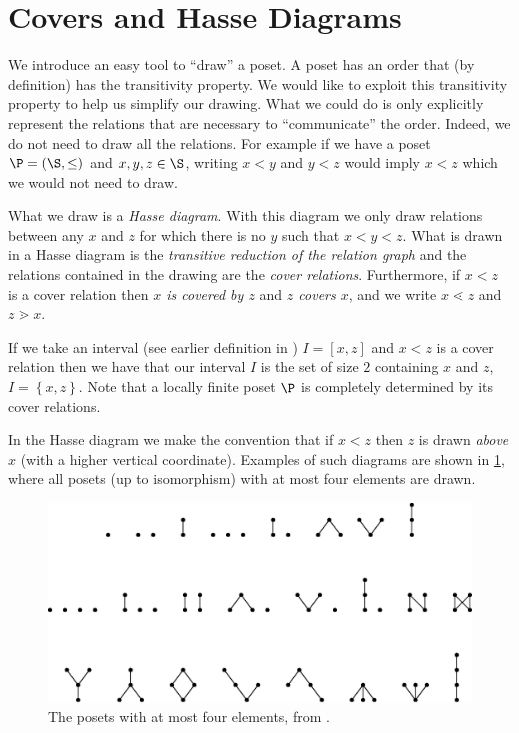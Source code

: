 \section{Covers and Hasse Diagrams}
\label{tree:poset:hasse}

We introduce an easy tool to ``draw'' a poset. A poset has an order that (by definition) has the transitivity property.
We would like to exploit this transitivity property to help us simplify our
drawing. What we could do is only explicitly represent the relations that are
necessary to ``communicate'' the order. Indeed, we do not need to draw
all the relations. For example if we have a poset $\P = (\S, \le)$ and $x, y, z
\in \S$, writing $x < y$ and $y < z$ would imply $x < z$ which we would not need
to draw.


What we draw is a \emph{Hasse diagram}. With this diagram we only draw
relations between any $x$ and $z$ for which there is no $y$ such that $x < y <
z$.
What is drawn in a Hasse diagram is the \emph{transitive reduction
of the relation graph} and the relations contained in the drawing are the
\emph{cover relations}. Furthermore, if $x < z$ is a cover relation then
\emph{$x$ is covered by $z$} and \emph{$z$ covers $x$}, and we write $x \lessdot z$
and $z \gtrdot x$.


If we take an interval (see earlier definition in ) $I
= [x, z]$ and $x < z$ is a cover relation then we have that our interval $I$ is
the set of size $2$ containing $x$ and $z$, \ie $I = \left\{{x, z}\right\}$.
Note that a locally finite poset $\P$ is completely determined by its cover
relations.

In the Hasse diagram we make the convention that if $x < z$ then $z$ is drawn
\emph{above} $x$ (\ie with a higher vertical coordinate). Examples of such
diagrams are shown in \ref{fig:stanley:3-1}, where all posets (up to
isomorphism) with at most four elements are drawn.


\begin{figure}
	\centering
	\includegraphics[width=\textwidth]{fig/stanley/3-1}
	\caption{\label{fig:stanley:3-1} The posets with at most four elements,
from \citet*{Stanley:2011:ECV:2124415}.}
\end{figure}


